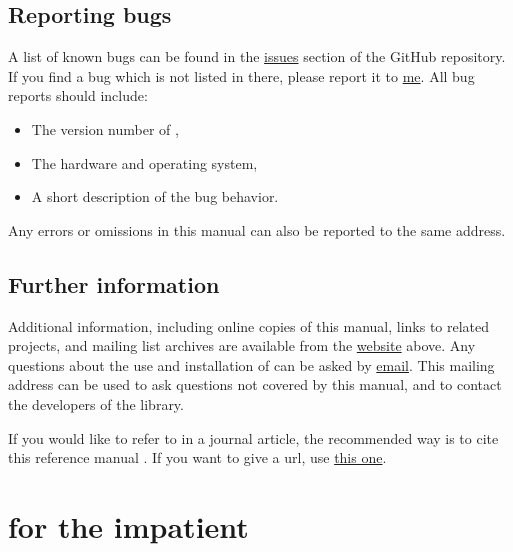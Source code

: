 \documentclass{ol-softwaremanual}
\begin{document}
\subsection{Reporting bugs}

A list of known bugs can be found in the \href{https://github.com/mcastel1/thelemacus/issues}{issues} section of the GitHub repository.
If you find a bug which is not listed in there, please report it to \href{mailto:michele.castellana@gmail.com}{me}. All bug reports should include:
\begin{itemize}
    \item The version number of \thel, 
    \item The hardware and operating system, 
    \item A short description of the bug behavior. 

\end{itemize}

Any errors or omissions in this manual can also be reported to the same address.


\subsection{Further information}


Additional information, including online copies of this manual, links to related projects, and mailing list archives are available from the \href{https://sites.google.com/site/michelecastellana/home}{website}  above.
Any questions about the use and installation of \thel can be asked by \href{mailto:michele.castellana@gmail.com}{email}. This mailing address can be used to ask questions not covered by this manual, and to contact the developers of the library.

If you would like to refer to \thel in a journal article, the recommended way is to cite this reference manual \cite{castellana2024thelemacus-documentation}. If you want to give a url, use  \href{https://sites.google.com/site/michelecastellana/home}{this one}. 


\pagebreak

\section{\thel for the impatient}
\end{document}
